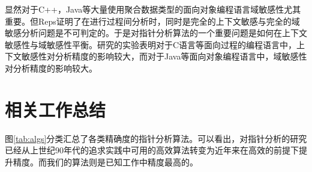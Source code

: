 显然对于C++，Java等大量使用聚合数据类型的面向对象编程语言域敏感性尤其重要。但Reps\supercite{repsUndecidable}证明了在进行过程间分析时，同时是完全的上下文敏感与完全的域敏感分析问题是不可判定的。于是对指针分析算法的一个重要问题是如何在上下文敏感性与域敏感性平衡。研究\supercite{fieldSensitivity}的实验表明对于C语言等面向过程的编程语言中，上下文敏感性对分析精度的影响较大，而对于Java等面向对象编程语言中，域敏感性对分析精度的影响较大。

\section{相关工作总结}

图\ref{tab:algs}分类汇总了各类精确度的指针分析算法。可以看出，对指针分析的研究已经从上世纪90年代的追求实践中可用的高效算法转变为近年来在高效的前提下提升精度。而我们的算法则是已知工作中精度最高的。

\newcommand{\tabitem}{~~\llap{\textbullet}~~}
\newcommand{\cisunif}{
	\makecell{
		\tabitem Weihl 1980\supercite{weihl1980interprocedural} 
		\\第一篇指针分析的研究工作\\ \\
		\tabitem Steensgaard 1996\supercite{Steensgaard1996} \\ 第一个高效的分析算法
	}
}

\newcommand{\csunif}{
	\makecell{
		\tabitem Lattner 2007\supercite{Lattner2007} 
		\\ 且是域敏感、堆上下文敏感的
	}
}

\newcommand{\cisinc}{
	\makecell{
		\tabitem Andersen 1994\supercite{andersen1994program}
		\\ \\
		\tabitem Hardekopf 2007\supercite{Hardekopf2007}
		\\ 进行动态SCC检测优化
	}
}

\newcommand{\csinc}{
	\makecell{
		\tabitem Whaley 2004\supercite{Whaley2004} \\ \\
		\tabitem Nystrom 2004\supercite{Nystrom2004} \\ 且是堆上下文敏感的 \\ \\
		\tabitem Sui 2014 \supercite{sui2014making}	
	}
}

\newcommand{\cisfs}{
	\makecell{
		\tabitem Choi 1993 \supercite{Choi:1993} \\ \\
		\tabitem Hardekopf 2009\supercite{Hardekopf2009} \\ 2011\supercite{Hardekopf2011} \\
		基于子集
	}
}

